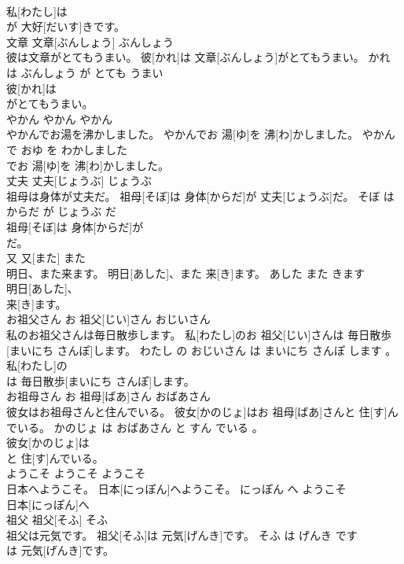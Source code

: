 \documentclass[8pt]{extreport}
\begin{document}
\begin{CJK}{UTF8}{min}
\\	私[わたし]は
\\	が 大好[だいす]きです。			
\\	文章	文章[ぶんしょう]	ぶんしょう	
\\	彼は文章がとてもうまい。	彼[かれ]は 文章[ぶんしょう]がとてもうまい。	かれ は ぶんしょう が とても うまい	
\\	彼[かれ]は
\\	がとてもうまい。			
\\	やかん	やかん	やかん	
\\	やかんでお湯を沸かしました。	やかんでお 湯[ゆ]を 沸[わ]かしました。	やかん で おゆ を わかしました	
\\	でお 湯[ゆ]を 沸[わ]かしました。			
\\	丈夫	丈夫[じょうぶ]	じょうぶ	
\\	祖母は身体が丈夫だ。	祖母[そぼ]は 身体[からだ]が 丈夫[じょうぶ]だ。	そぼ は からだ が じょうぶ だ	
\\	祖母[そぼ]は 身体[からだ]が
\\	だ。			
\\	又	又[また]	また	
\\	明日、また来ます。	明日[あした]、また 来[き]ます。	あした また きます	
\\	明日[あした]、
\\	来[き]ます。			
\\	お祖父さん	お 祖父[じい]さん	おじいさん	
\\	私のお祖父さんは毎日散歩します。	私[わたし]のお 祖父[じい]さんは 毎日散歩[まいにち さんぽ]します。	わたし の おじいさん は まいにち さんぽ します 。	
\\	私[わたし]の
\\	は 毎日散歩[まいにち さんぽ]します。			
\\	お祖母さん	お 祖母[ばあ]さん	おばあさん	
\\	彼女はお祖母さんと住んでいる。	彼女[かのじょ]はお 祖母[ばあ]さんと 住[す]んでいる。	かのじょ は おばあさん と すん でいる 。	
\\	彼女[かのじょ]は
\\	と 住[す]んでいる。			
\\	ようこそ	ようこそ	ようこそ	
\\	日本へようこそ。	日本[にっぽん]へようこそ。	にっぽん へ ようこそ	
\\	日本[にっぽん]へ
\\	祖父	祖父[そふ]	そふ	
\\	祖父は元気です。	祖父[そふ]は 元気[げんき]です。	そふ は げんき です	
\\	は 元気[げんき]です。			

\end{CJK}
\end{document}
